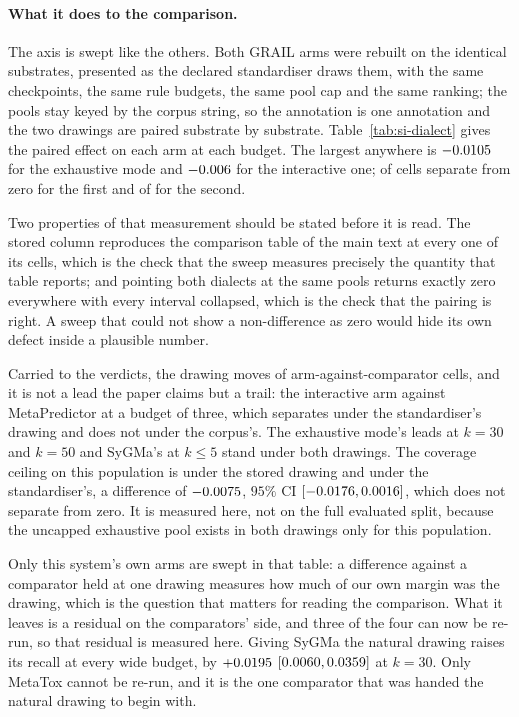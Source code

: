 \documentclass[journal=jcisd8,manuscript=suppinfo,layout=onecolumn]{achemso}
\begin{document}
\paragraph{What it does to the comparison.} The axis is swept like the others. Both GRAIL arms
were rebuilt on the identical substrates, presented as the declared standardiser draws them, with
the same checkpoints, the same rule budgets, the same pool cap and the same ranking; the pools
stay keyed by the corpus string, so the annotation is one annotation and the two drawings are
paired substrate by substrate. Table~\ref{tab:si-dialect} gives the paired effect on each arm at
each budget. The largest anywhere is $-0.0105$ for the exhaustive mode and
$-0.006$ for the interactive one; \numDsweepExhSeparatingWord{} of
\numDsweepExhBudgetsWord{} cells separate from zero for the first and
\numDsweepInterSeparatingWord{} of \numDsweepInterBudgetsWord{} for the second.

Two properties of that measurement should be stated before it is read. The stored column
reproduces the comparison table of the main text at every one of its cells, which is the check
that the sweep measures precisely the quantity that table reports; and pointing both
dialects at the same pools returns exactly zero everywhere with every interval collapsed, which is
the check that the pairing is right. A sweep that could not show a non-difference as zero would
hide its own defect inside a plausible number.

Carried to the verdicts, the drawing moves \numDsweepMoved{} of \numDsweepCells{}
arm-against-comparator cells, and it is not a lead the paper claims but a trail: the interactive
arm against MetaPredictor at a budget of three, which separates under the standardiser's drawing
and does not under the corpus's. The exhaustive mode's
leads at $k=30$ and $k=50$ and SyGMa's at $k \le 5$ stand under both drawings. The coverage
ceiling on this population is \numDsweepCeilingstored{} under the stored drawing and
\numDsweepCeilingdrawn{} under the standardiser's, a difference of $-0.0075$,
$95\%$ CI $[-0.0176, 0.0016]$, which does not separate from zero. It is
measured here, not on the full evaluated split, because the uncapped exhaustive pool exists
in both drawings only for this population.

Only this system's own arms are swept in that table: a difference against a comparator held at
one drawing measures how much of our own margin was the drawing, which is the question that
matters for reading the comparison. What it leaves is a residual on the comparators' side, and
three of the four can now be re-run, so that residual is measured here. Giving SyGMa
the natural drawing raises its recall at every wide budget, by $+0.0195$
$[0.0060, 0.0359]$ at $k=30$. Only MetaTox cannot be re-run, and
it is the one comparator that was handed the natural drawing to begin with.
\end{document}
